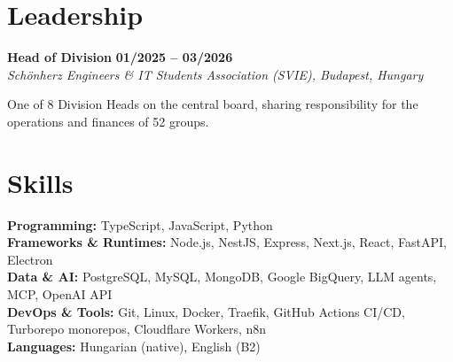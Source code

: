 \documentclass[10pt, a4paper]{article}
\newcommand{\cventry}[3]{
    {\large\bfseries\color{AccentColor}#1}
    \hfill
    {\large\bfseries\color{AccentColor}#3} \\
    \textit{#2}
    \vspace{2pt}
}
\begin{document}
\section*{Leadership}

\cventry{Head of Division}{Schönherz Engineers \& IT Students Association (SVIE), Budapest, Hungary}{01/2025 – 03/2026}

\vspace{0.5ex}
One of 8 Division Heads on the central board, sharing responsibility for the operations and finances of 52 groups.

\section*{Skills}

\textbf{\color{AccentColor}Programming:} TypeScript, JavaScript, Python \\
\textbf{\color{AccentColor}Frameworks \& Runtimes:} Node.js, NestJS, Express, Next.js, React, FastAPI, Electron \\
\textbf{\color{AccentColor}Data \& AI:} PostgreSQL, MySQL, MongoDB, Google BigQuery, LLM agents, MCP, OpenAI API \\
\textbf{\color{AccentColor}DevOps \& Tools:} Git, Linux, Docker, Traefik, GitHub Actions CI/CD, Turborepo monorepos, Cloudflare Workers, n8n \\
\textbf{\color{AccentColor}Languages:} Hungarian (native), English (B2)

\end{document}
